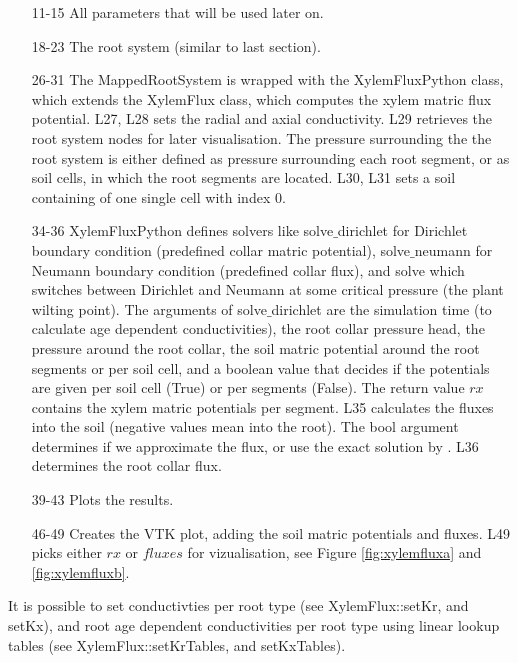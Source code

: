 
\begin{itemize}

\item[11-15] All parameters that will be used later on.

\item[18-23] The root system (similar to last section). 

\item[26-31] The MappedRootSystem is wrapped with the XylemFluxPython class, which extends the XylemFlux class, which computes the xylem matric flux potential. L27, L28 sets the radial and axial conductivity. L29 retrieves the root system nodes for later visualisation. The pressure surrounding the the root system is either defined as pressure surrounding each root segment, or as soil cells, in which the root segments are located. L30, L31 sets a soil containing of one single cell with index 0. 

\item[34-36] XylemFluxPython defines solvers like solve$\_$dirichlet for Dirichlet boundary condition (predefined collar matric potential), solve$\_$neumann for Neumann boundary condition (predefined collar flux), and solve which switches between Dirichlet and Neumann at some critical pressure (the plant wilting point).
The arguments of solve$\_$dirichlet are the simulation time (to calculate age dependent conductivities), the root collar pressure head, the pressure around the root collar, the soil matric potential around the root segments or per soil cell, and a boolean value that decides if the potentials are given per soil cell (True) or per segments (False). The return value $rx$ contains the xylem matric potentials per segment. L35 calculates the fluxes into the soil (negative values mean into the root). The bool argument determines if we approximate the flux, or use the exact solution by \cite{meunier2017hybrid}.
L36 determines the root collar flux.

\item[39-43] Plots the results.

\item[46-49] Creates the VTK plot, adding the soil matric potentials and fluxes. L49 picks either $rx$ or $fluxes$ for vizualisation, see Figure \ref{fig:xylemfluxa} and \ref{fig:xylemfluxb}.

\end{itemize}

It is possible to set conductivties per root type (see XylemFlux::setKr, and setKx), and root age dependent conductivities per root type using linear lookup tables (see XylemFlux::setKrTables, and setKxTables).


